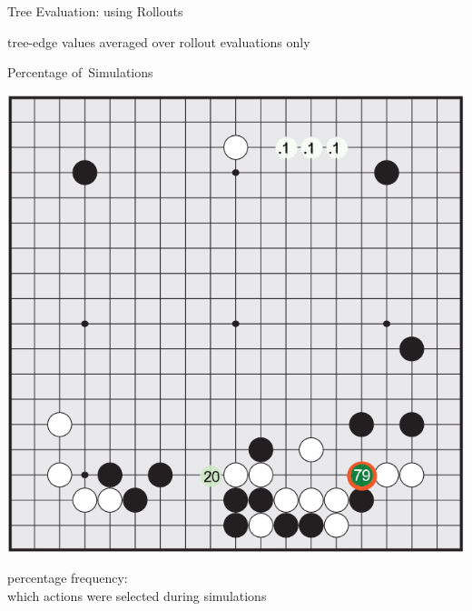 \documentclass{beamer}
\begin{document}
{\begin{frame}{Tree Evaluation: using Rollouts}
\begin{center}
        \tiny
        tree-edge values averaged over rollout evaluations only
      \end{center}
    \end{frame}

    \begin{frame}{Percentage of~Simulations}
      \begin{center}
        \includegraphics[height=.8\textheight]{../img/percentage_of_simulations.png}

        \tiny
        percentage frequency:\\
        which actions were selected during simulations
      \end{center}
    \end{frame}

}
\end{document}
